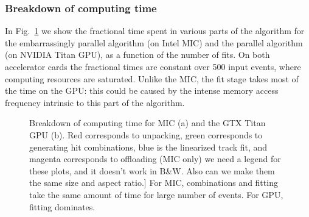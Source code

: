 \documentclass[a4]{jpconf}
\providecommand{\fixme}[1]{\xspace{\sffamily{[\bfseries{}FIXME:} #1]}}
\begin{document}
\subsubsection{Breakdown of computing time}
In Fig.~\ref{fig:breakdown} we show the fractional time spent in
various parts of the algorithm for the embarrassingly parallel algorithm 
(on Intel MIC) and the parallel algorithm (on NVIDIA Titan GPU), as a 
function of the number of fits. On both accelerator cards the fractional times
are constant over 500 input events, where computing resources are saturated. 
Unlike the MIC, the fit stage takes most of the time on the GPU: this 
could be caused by the intense memory access frequency intrinsic to
this part of the algorithm.  
\begin{figure}[tbp]
\centering
{}
\caption{Breakdown of computing time for MIC (a) and the GTX Titan GPU
  (b). Red corresponds to unpacking, green corresponds to generating
  hit combinations, blue is the linearized track fit, and magenta
  corresponds to offloading (MIC only)\fixme{we need a legend for
    these plots, and it doesn't work in B\&W. Also can we make them
    the same size and aspect ratio.} For MIC, combinations and fitting
  take the same amount of time for large number of events. For GPU,
  fitting dominates. }
\label{fig:breakdown}
\end{figure}
\end{document}
